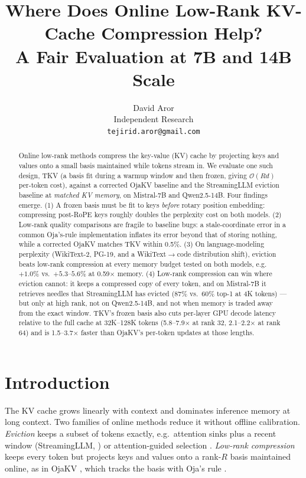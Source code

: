 \documentclass{article}
\title{\textbf{Where Does Online Low-Rank KV-Cache Compression Help?\\
A Fair Evaluation at 7B and 14B Scale}}
\author{
  David Aror \\
  Independent Research \\
  \texttt{tejirid.aror@gmail.com}
}
\date{}
\begin{document}
\ifcolmsubmission
\linenumbers
\fi

\maketitle

\begin{abstract}
Online low-rank methods compress the key-value (KV) cache by projecting keys
and values onto a small basis maintained while tokens stream in. We evaluate
one such design, TKV (a basis fit during a warmup window and then frozen,
giving $\mathcal{O}(R d)$ per-token cost), against a corrected OjaKV baseline
and the StreamingLLM eviction baseline at \emph{matched KV memory}, on
Mistral-7B and Qwen2.5-14B. Four findings emerge. (1) A frozen basis must be
fit to keys \emph{before} rotary position embedding: compressing post-RoPE
keys roughly doubles the perplexity cost on both models. (2) Low-rank quality
comparisons are fragile to baseline bugs: a stale-coordinate error in a
common Oja's-rule implementation inflates its error beyond that of storing
nothing, while a corrected OjaKV matches TKV within 0.5\%. (3) On
language-modeling perplexity (WikiText-2, PG-19, and a WikiText$\to$code
distribution shift), eviction beats low-rank compression at every memory
budget tested on both models, e.g.\ $+1.0\%$ vs.\ $+5.3$--$5.6\%$ at 0.59$\times$
memory. (4) Low-rank compression can win where eviction cannot: it keeps a
compressed copy of every token, and on Mistral-7B it retrieves needles that
StreamingLLM has evicted (87\% vs.\ 60\% top-1 at 4K tokens) --- but only at high
rank, not on Qwen2.5-14B, and not when memory is traded away from the exact
window. TKV's frozen basis also cuts per-layer GPU decode latency relative to the full
cache at 32K--128K tokens (5.8--7.9$\times$ at rank 32, 2.1--2.2$\times$ at rank 64)
and is 1.5--3.7$\times$ faster than OjaKV's per-token updates at those lengths.
\end{abstract}

\section{Introduction}
\label{sec:intro}

The KV cache grows linearly with context and dominates inference memory at
long context. Two families of online methods reduce it without offline
calibration. \emph{Eviction} keeps a subset of tokens exactly, e.g.\ attention
sinks plus a recent window (StreamingLLM, \citealp{streamingllm2023}) or
attention-guided selection \citep{h2o2023,snapkv2024}. \emph{Low-rank
compression} keeps every token but projects keys and values onto a rank-$R$
basis maintained online, as in OjaKV \citep{ojakov2025}, which tracks the basis
with Oja's rule \citep{oja1982}.
\end{document}
